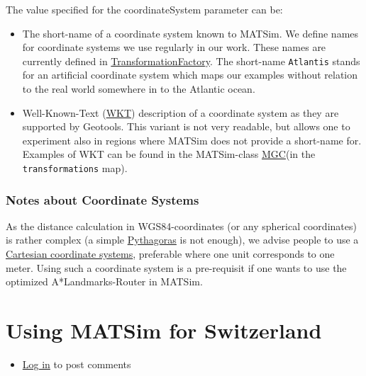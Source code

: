 \documentclass[a4paper,11pt]{report}
\begin{document}
The value specified for the coordinateSystem parameter can be:
\begin{itemize}
	\item The short-name of a coordinate system known to MATSim. We define  names for coordinate systems we use regularly in our work. These names  are currently defined in \href{http://matsim.svn.sourceforge.net/viewvc/matsim/matsim/trunk/src/main/java/org/matsim/core/utils/geometry/transformations/TransformationFactory.java?view=markup}{TransformationFactory}. The short-name 
\texttt{Atlantis}  stands for an artificial coordinate system which maps our examples  without relation to the real world somewhere in to the Atlantic ocean.
	\item Well-Known-Text (\href{http://www.geoapi.org/snapshot/javadoc/org/opengis/referencing/doc-files/WKT.html}{WKT})  description of a coordinate system as they are supported by Geotools.  This variant is not very readable, but allows one to experiment also in  regions where MATSim does not provide a short-name for. Examples of WKT  can be found in the MATSim-class \href{http://matsim.svn.sourceforge.net/viewvc/matsim/matsim/trunk/src/main/java/org/matsim/core/utils/geometry/geotools/MGC.java?view=markup}{MGC}(in the 
\texttt{transformations} map).
\end{itemize}

\subsubsection{Notes about Coordinate Systems}

As the distance calculation in WGS84-coordinates (or any spherical coordinates) is rather complex (a simple \href{http://en.wikipedia.org/wiki/Pythagorean_theorem}{Pythagoras} is not enough), we advise people to use a \href{http://en.wikipedia.org/wiki/Coordinate_system}{Cartesian coordinate systems},  preferable where one unit corresponds to one meter. Using such a  coordinate system is a pre-requisit if one wants to use the optimized  A*Landmarks-Router in MATSim.

\vfill\eject
\section{Using MATSim for Switzerland}
\begin{itemize}
	\item \href{http://www.matsim.org/user/login?destination=comment/reply/580%23comment-form}{Log in} to post comments
\end{itemize}
\end{document}
